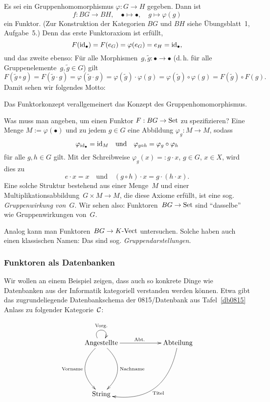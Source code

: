 Es sei ein Gruppenhomomorphismus $\varphi : G \to H$ gegeben. Dann ist
  \[ f : BG \to BH, \quad \bullet \mapsto \bullet, \quad g \mapsto \varphi(g) \]
ein Funktor. (Zur Konstruktion der Kategorien $BG$ und $BH$ siehe Übungsblatt~1, Aufgabe~5.)
Denn das erste Funktoraxiom ist erfüllt,
\[
  F(\mathrm{id}_\bullet) = F(e_G) = \varphi(e_G) = e_H = \mathrm{id}_\bullet,
\]
und das zweite ebenso: Für alle Morphismen~$g, \tilde g : \bullet \to \bullet$
(d.\,h. für alle Gruppenelemente~$g, \tilde g \in G$) gilt
\[
  F(\tilde{g} \circ g) = F(\tilde{g} \cdot g) = \varphi(\tilde{g} \cdot g) =
  \varphi(\tilde{g}) \cdot \varphi(g) = \varphi(\tilde{g}) \circ \varphi(g) =
  F(\tilde{g}) \circ F(g). \]
Damit sehen wir folgendes Motto:
\begin{motto}Das Funktorkonzept verallgemeinert das Konzept des
Gruppenhomomorphismus.\end{motto}


Was muss man angeben, um einen Funktor $F : BG \to \mathrm{Set}$ zu spezifizieren? Eine
Menge $M := \varphi(\bullet)$ und zu jedem $g \in G$ eine Abbildung $\varphi_g : M \to M$, sodass
\[ \varphi_{\mathrm{id}_\bullet} = \mathrm{id}_M \quad \text{und} \quad \varphi_{g \circ h} = \varphi_g \circ \varphi_h \]
für alle $g, h \in G$ gilt. Mit der Schreibweise $\varphi_g(x) =: g \cdot x$, $g \in G$, $x \in X$, wird dies zu
\[ e \cdot x = x \quad \text{und} \quad (g \circ h) \cdot x = g \cdot (h \cdot x).\]
Eine solche Struktur bestehend aus einer Menge~$M$ und einer
Multiplikationsabbildung~$G \times M \to M$, die diese Axiome erfüllt, ist eine
sog. \emph{Gruppenwirkung von~$G$}. Wir sehen also: Funktoren~$BG \to \mathrm{Set}$
sind "`dasselbe"' wie Gruppenwirkungen von~$G$.

Analog kann man Funktoren~$BG \to {K\text{-}\mathrm{Vect}}$ untersuchen. Solche haben
auch einen klassischen Namen: Das sind sog. \emph{Gruppendarstellungen}.


\subsubsection{Funktoren als Datenbanken}

Wir wollen an einem Beispiel zeigen, dass auch so konkrete Dinge wie
Datenbanken aus der Informatik kategoriell verstanden werden können. Etwa gibt
das zugrundeliegende Datenbankschema der 0815/Datenbank aus Tafel~\ref{db0815}
Anlass zu folgender Kategorie~$\mathcal{C}$:

\[ \xymatrixcolsep{5pc} \xymatrixrowsep{5pc} \xymatrix{
  \text{Angestellte}
    \ar@(ul,ur)^{\text{Vorg.}}
    \ar[r]^{\text{Abt.}}
    \ar@/^2pc/[d]^{\text{Nachname}}
    \ar@/_2pc/[d]_{\text{Vorname}}
  & \text{Abteilung}
    \ar@/^3pc/[dl]^{\text{Titel}} \\
  \text{String}
} \]


